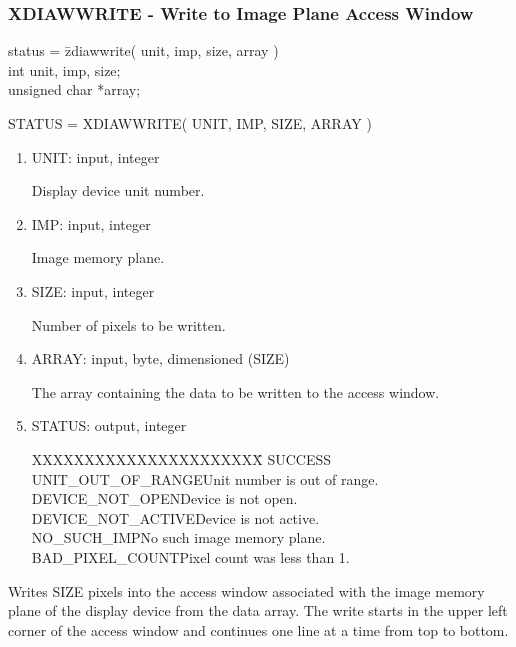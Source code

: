 \subsubsection{XDIAWWRITE - Write to Image Plane Access Window}
\begin{tabbing}
status = \=zdiawwrite( unit, imp, size, array )\\
\>int  unit, imp, size;\\
\>unsigned char  *array;\\
\end{tabbing}
STATUS = XDIAWWRITE( UNIT, IMP, SIZE, ARRAY )
\begin{enumerate}
\item UNIT:  input, integer

Display device unit number.
\item IMP:  input, integer

Image memory plane.
\item SIZE:  input, integer

Number of pixels to be written.
\item ARRAY:  input, byte, dimensioned (SIZE)

The array containing the data to be written to the access window.
\item STATUS:  output, integer
\begin{tabbing}
XXXXXXXXXXXXXXXXXXXXXX\=\kill
SUCCESS\\
UNIT\_OUT\_OF\_RANGE\>Unit number is out of range.\\
DEVICE\_NOT\_OPEN\>Device is not open.\\
DEVICE\_NOT\_ACTIVE\>Device is not active.\\
NO\_SUCH\_IMP\>No such image memory plane.\\
BAD\_PIXEL\_COUNT\>Pixel count was less than 1.\\
\end{tabbing}
\end{enumerate}
Writes SIZE pixels into the access window associated with the image
memory plane of the display device from the data array.  The write
starts in the upper left corner of the access window and continues
one line at a time from top to bottom.
\newpage
